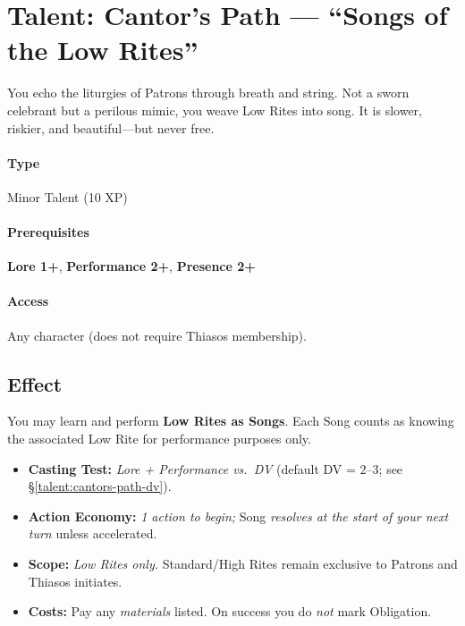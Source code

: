 \section{Talent: Cantor's Path --- ``Songs of the Low Rites''}
\label{talent:cantors-path}

\begin{tcolorbox}[colback=black!3,colframe=black!40!white,title={Cantor's Path}]
You echo the liturgies of Patrons through breath and string. Not a sworn celebrant but a perilous mimic, you weave Low Rites into song. It is slower, riskier, and beautiful---but never free.
\end{tcolorbox}

\paragraph*{Type} Minor Talent (10 XP) \quad
\paragraph*{Prerequisites} \textbf{Lore 1+}, \textbf{Performance 2+}, \textbf{Presence 2+} \quad
\paragraph*{Access} Any character (does not require Thiasos membership).

\subsection*{Effect}
You may learn and perform \textbf{Low Rites as Songs}. Each Song counts as knowing the associated Low Rite for performance purposes only.

\begin{itemize}
\item \textbf{Casting Test:} \emph{Lore + Performance vs.\ DV} (default DV = 2--3; see \S\ref{talent:cantors-path-dv}).
\item \textbf{Action Economy:} \emph{1 action to begin;} Song \emph{resolves at the start of your next turn} unless accelerated.
\item \textbf{Scope:} \emph{Low Rites only.} Standard/High Rites remain exclusive to Patrons and Thiasos initiates.
\item \textbf{Costs:} Pay any \emph{materials} listed. On success you do \emph{not} mark Obligation.
\end{itemize}

